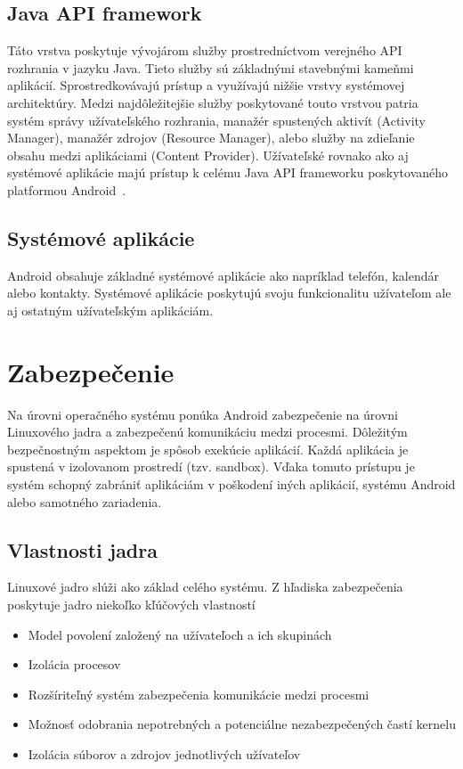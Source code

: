 \subsection{Java API framework}
Táto vrstva poskytuje vývojárom služby prostredníctvom verejného API rozhrania v jazyku Java. Tieto služby sú základnými stavebnými kameňmi aplikácií. Sprostredkovávajú prístup a využívajú nižšie vrstvy systémovej architektúry. Medzi najdôležitejšie služby poskytované touto vrstvou patria systém správy užívateľského rozhrania, manažér spustených aktivít (Activity Manager), manažér zdrojov (Resource Manager), alebo služby na zdieľanie obsahu medzi aplikáciami (Content Provider). 
Užívateľské rovnako ako aj systémové aplikácie majú prístup k celému Java API frameworku poskytovaného platformou Android~\cite{PlatformArchitecture}.

\subsection{Systémové aplikácie}
Android obsahuje základné systémové aplikácie ako napríklad telefón, kalendár alebo kontakty. Systémové aplikácie poskytujú svoju funkcionalitu užívateľom ale aj ostatným užívateľským aplikáciám.		


\section{Zabezpečenie}
Na úrovni operačného systému ponúka Android zabezpečenie na úrovni Linuxového jadra a zabezpečenú komunikáciu medzi procesmi.  Dôležitým bezpečnostným aspektom je spôsob exekúcie aplikácií. Každá aplikácia je spustená v izolovanom prostredí (tzv. sandbox). Vďaka tomuto prístupu je systém schopný zabrániť aplikáciám v poškodení iných aplikácií, systému Android alebo samotného zariadenia.

\subsection{Vlastnosti jadra}
Linuxové jadro slúži ako základ celého systému. Z hľadiska zabezpečenia poskytuje jadro niekoľko kľúčových vlastností 


\begin{itemize}
\item Model povolení založený na užívateľoch a ich skupinách
\item Izolácia procesov
\item Rozšíriteľný systém zabezpečenia komunikácie medzi procesmi
\item Možnosť odobrania nepotrebných a potenciálne nezabezpečených častí kernelu
\item Izolácia súborov a zdrojov jednotlivých užívateľov
\end{itemize}

